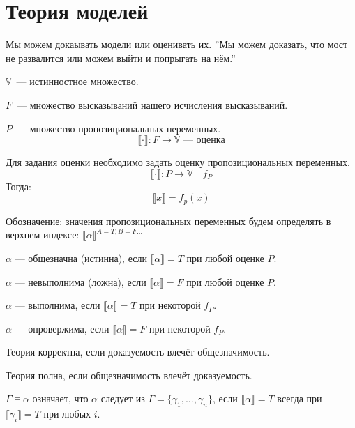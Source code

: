 \section{Теория моделей}
Мы можем докаывать модели или оценивать их.
''Мы можем доказать, что мост не развалится или можем выйти и попрыгать на нём.''

\begin{definition}
    $\mathbb{V}$~--- истинностное множество.

    $F$~--- множество высказываний нашего исчисления высказываний.

    $P$~--- множество пропозициональных переменных.
    \[ \llbracket\cdot\rrbracket: F \to \mathbb{V} \text{~--- оценка}\]
\end{definition}

\begin{definition}
    Для задания оценки необходимо задать оценку пропозициональных переменных.
    \[\llbracket \cdot \rrbracket : P\to \mathbb{V} \quad f_P\]
    Тогда: 
    \[ \llbracket x \rrbracket = f_p(x)\]
\end{definition}

\begin{remark}
    Обозначение: значения пропозициональных переменных будем определять в верхнем индексе: $\llbracket \alpha \rrbracket ^{A = T, B = F \ldots}$
\end{remark}


\begin{definition}
    $\alpha$ --- общезначна (истинна), если $\llbracket \alpha \rrbracket = T$ при любой оценке $P$.

    $\alpha$ --- невыполнима (ложна), если $\llbracket \alpha \rrbracket = F$ при любой оценке $P$.
    
    $\alpha$ --- выполнима, если $\llbracket \alpha \rrbracket = T$ при некоторой $f_P$.

    $\alpha$ --- опровержима, если $\llbracket \alpha \rrbracket = F$ при некоторой $f_P$.
\end{definition}

\begin{definition}
    Теория корректна, если доказуемость влечёт общезначимость.

    Теория полна, если общезначимость влечёт доказуемость.
\end{definition}

\begin{definition}
    $\Gamma \vDash \alpha$ означает, что $\alpha$ следует из $\Gamma = \{ \gamma_1, \ldots, \gamma_n\}$, если $\llbracket \alpha \rrbracket = T$ всегда при $\llbracket \gamma_i \rrbracket = T$ при любых $i$.  
\end{definition}

